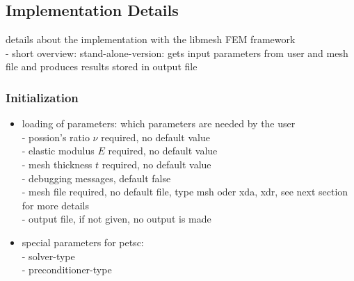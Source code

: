  \subsection{Implementation Details}
 details about the implementation with the libmesh FEM framework \\%
 - short overview: stand-alone-version: gets input parameters from user and mesh file and produces results stored in output file

 
  \subsubsection{Initialization}
   \begin{itemize}
   	\item loading of parameters: which parameters are needed by the user\\
   	- possion's ratio $\nu$ required, no default value\\
   	- elastic modulus $E$ required, no default value\\
   	- mesh thickness $t$ required, no default value\\
   	- debugging messages, default false\\
   	- mesh file required, no default file, type msh oder xda, xdr, see next section for more details\\
   	- output file, if not given, no output is made
   	
   	\item special parameters for petsc:\\
   	- solver-type\\
   	- preconditioner-type
   \end{itemize}
   
   
   
